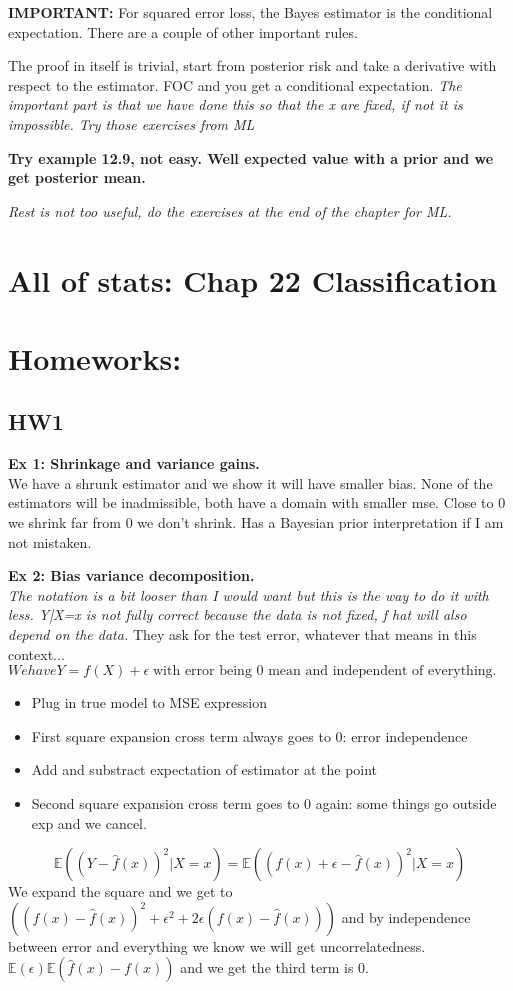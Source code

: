 \documentclass{article}
\begin{document}
\textbf{IMPORTANT:} For squared error loss, the Bayes estimator is the conditional expectation.
There are a couple of other important rules.

The proof in itself is trivial, start from posterior risk and take a derivative with respect to the estimator.
FOC and you get a conditional expectation. \textit{The important part is that we have done this so that the x are fixed, if not it is impossible. Try those exercises from ML}

\textbf{Try example 12.9, not easy. Well expected value with a prior and we get posterior mean.}

\textit{Rest is not too useful, do the exercises at the end of the chapter for ML.}

\section{All of stats: Chap 22 Classification}

\section*{Homeworks:}
\subsection*{HW1}
\textbf{Ex 1: Shrinkage and variance gains.}\\
We have a shrunk estimator and we show it will have smaller bias. None 
of the estimators will be inadmissible, both have a domain with smaller mse. 
Close to 0 we shrink far from 0 we don't shrink. Has a Bayesian prior interpretation if I am not mistaken.

\textbf{Ex 2: Bias variance decomposition.}\\
\textit{The notation is a bit looser than I would want but this is the way to 
do it with less. Y|X=x is not fully correct because the data is not fixed, f hat will also depend on the data.}
They ask for the test error, whatever that means in this context... $We have Y = f(X) +\epsilon\; \text{with error being 0 mean and independent of everything.}$
\begin{itemize}
    \item Plug in true model to MSE expression
    \item First square expansion cross term always goes to 0: error independence
    \item Add and substract expectation of estimator at the point
    \item Second square expansion cross term goes to 0 again: some things go outside exp and we cancel. 
\end{itemize}
$$\mathbb{E}((Y - \hat{f}(x))^2|X=x) = \mathbb{E}((f(x)+ \epsilon -\hat{f}(x))^2|X=x)  $$
We expand the square and we get to $((f(x)-\hat{f}(x))^2 + \epsilon^2 + 2\epsilon (f(x)-\hat{f}(x))  )$
and by independence between error and everything we know we will get uncorrelatedness. $\mathbb{E}(\epsilon)\mathbb{E}(\hat{f}(x)-f(x))  $ 
and we get the third term is 0.
\end{document}
